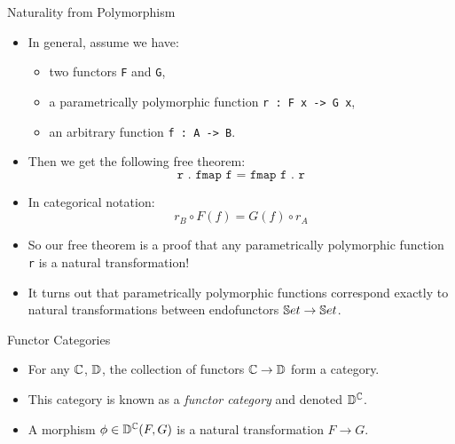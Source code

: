 \begin{frame}{Naturality from Polymorphism}
    \begin{itemize}
      \item In general, assume we have:
      \begin{itemize}
        \pause\item two functors \texttt{F} and \texttt{G},
        \pause\item a parametrically polymorphic function \texttt{r : F x -> G x},
        \pause\item an arbitrary function \texttt{f : A -> B}.
      \end{itemize}
      \pause\item Then we get the following free theorem:
      \begin{equation*}
       \texttt{r . fmap f = fmap f . r}
      \end{equation*}
      \vspace{-18pt}
      \pause\item In categorical notation:
      \begin{equation*}
        r_B \circ F(f) = G(f) \circ r_A
      \end{equation*}
      \vspace{-18pt}
      \pause\item So our free theorem is a proof that any parametrically polymorphic function \texttt{r} is a natural transformation!
      \pause\item It turns out that parametrically polymorphic functions correspond exactly to natural transformations between endofunctors $\mathbb{S} et \to \mathbb{S} et$.
    \end{itemize}
\end{frame}
\begin{frame}{Functor Categories}
 \begin{itemize}
  \item For any $\mathbb{C}$, $\mathbb{D}$, the collection of functors $\mathbb{C} \to \mathbb{D}$ form a category.
  \pause\item This category is known as a \textit{functor category} and denoted $\mathbb{D}^{\mathbb{C}}$.
  \pause\item A morphism $\phi \in \mathbb{D}^{\mathbb{C}}(F, G)$ is a natural transformation $F \to G$.
 \end{itemize}
\end{frame}
